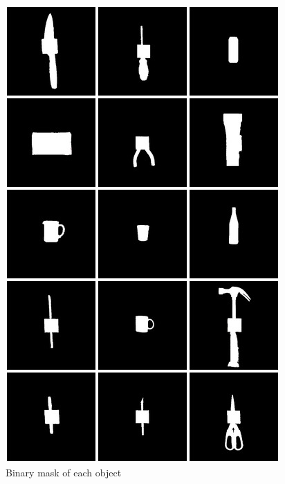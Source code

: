 \begin{figure}
	\centering
	\includegraphics[width=\textwidth]{img/methods/masks.jpg}
	\caption{Binary mask of each object}
	\label{fig:masks_montage}
\end{figure}

